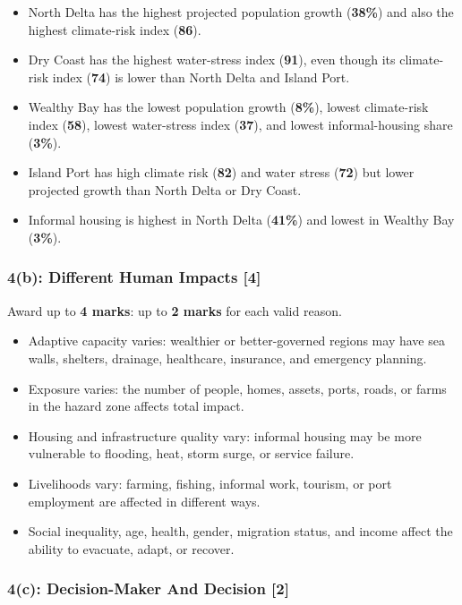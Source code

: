 \documentclass[11pt,a4paper]{article}
\newcommand{\term}[1]{\textcolor{HeadingBlue}{\textbf{#1}}}
\newcommand{\score}[1]{\textcolor{AccentTeal}{\textbf{#1}}}
\begin{document}
\begin{itemize}
  \item North Delta has the highest projected population growth
  (\term{38\%}) and also the highest climate-risk index (\term{86}).
  \item Dry Coast has the highest water-stress index (\term{91}), even though
  its climate-risk index (\term{74}) is lower than North Delta and Island Port.
  \item Wealthy Bay has the lowest population growth (\term{8\%}), lowest
  climate-risk index (\term{58}), lowest water-stress index (\term{37}), and
  lowest informal-housing share (\term{3\%}).
  \item Island Port has high climate risk (\term{82}) and water stress
  (\term{72}) but lower projected growth than North Delta or Dry Coast.
  \item Informal housing is highest in North Delta (\term{41\%}) and lowest in
  Wealthy Bay (\term{3\%}).
\end{itemize}

\subsubsection{4(b): Different Human Impacts [4]}

Award up to \score{4 marks}: up to \score{2 marks} for each valid reason.

\begin{itemize}
  \item Adaptive capacity varies: wealthier or better-governed regions may have
  sea walls, shelters, drainage, healthcare, insurance, and emergency planning.
  \item Exposure varies: the number of people, homes, assets, ports, roads, or
  farms in the hazard zone affects total impact.
  \item Housing and infrastructure quality vary: informal housing may be more
  vulnerable to flooding, heat, storm surge, or service failure.
  \item Livelihoods vary: farming, fishing, informal work, tourism, or port
  employment are affected in different ways.
  \item Social inequality, age, health, gender, migration status, and income
  affect the ability to evacuate, adapt, or recover.
\end{itemize}

\subsubsection{4(c): Decision-Maker And Decision [2]}
\end{document}
